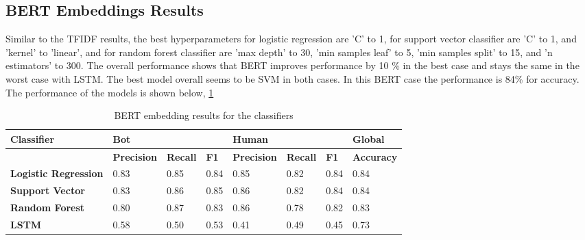 \documentclass[12pt]{article}
\begin{document}
\subsection{BERT Embeddings Results}
Similar to the TFIDF results, the best hyperparameters for logistic regression are 'C'  to 1, for support vector classifier are 'C' to 1, and 'kernel' to 'linear', and for random forest classifier are 'max depth' to 30, 'min samples leaf' to 5, 'min samples split' to 15, and 'n estimators' to 300. The overall performance shows that BERT improves performance by 10 \% in the best case and stays the same in the worst case with LSTM.  The best model overall seems to be SVM in both cases. In this BERT case the performance is 84\% for accuracy. The performance of the models is shown below, \ref{table:bert}
\begin{table}[ht]
\begin{tabular}{|l|lll|lll|l|}
\hline
\textbf{Classifier}          & \multicolumn{3}{l|}{\textbf{Bot	}}                                                          & \multicolumn{3}{l|}{\textbf{Human}}                                                            & \textbf{Global}   \\ \hline
\textbf{}                    & \multicolumn{1}{l|}{\textbf{Precision}} & \multicolumn{1}{l|}{\textbf{Recall}} & \textbf{F1} & \multicolumn{1}{l|}{\textbf{Precision}} & \multicolumn{1}{l|}{\textbf{Recall}} & \textbf{F1} & \textbf{Accuracy} \\ \hline
\textbf{Logistic Regression} & \multicolumn{1}{l|}{0.83}               & \multicolumn{1}{l|}{0.85}            & 0.84        & \multicolumn{1}{l|}{0.85}               & \multicolumn{1}{l|}{0.82}            & 0.84        & 0.84              \\ \hline
\textbf{Support Vector}      & \multicolumn{1}{l|}{0.83}               & \multicolumn{1}{l|}{0.86}            & 0.85        & \multicolumn{1}{l|}{0.86}               & \multicolumn{1}{l|}{0.82}            & 0.84        & 0.84              \\ \hline
\textbf{Random Forest}       & \multicolumn{1}{l|}{0.80}               & \multicolumn{1}{l|}{0.87}            & 0.83        & \multicolumn{1}{l|}{0.86}               & \multicolumn{1}{l|}{0.78}            & 0.82        & 0.83              \\ \hline
\textbf{LSTM}                & \multicolumn{1}{l|}{0.58}                   & \multicolumn{1}{l|}{0.50}                &0.53             & \multicolumn{1}{l|}{0.41}                   & \multicolumn{1}{l|}{0.49}                &0.45             & 0.73              \\ \hline
\end{tabular}
\caption{BERT embedding results for the classifiers}
\label{table:bert}
\end{table}
\end{document}
